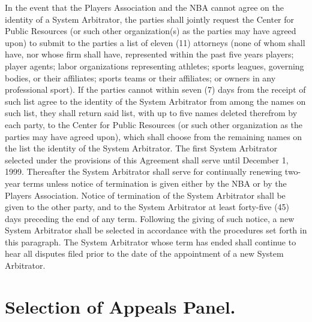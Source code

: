 \documentclass[
]{book}
\begin{document}
In the event that the Players Association and the NBA cannot agree on the identity of a System Arbitrator, the parties shall jointly request the Center for Public Resources (or such other organization(s) as the parties may have agreed upon) to submit to the parties a list of eleven (11) attorneys (none of whom shall have, nor whose firm shall have, represented within the past five years players; player agents; labor organizations representing athletes; sports leagues, governing bodies, or their affiliates; sports teams or their affiliates; or owners in any professional sport). If the parties cannot within seven (7) days from the receipt of such list agree to the identity of the System Arbitrator from among the names on such list, they shall return said list, with up to five names deleted therefrom by each party, to the Center for Public Resources (or such other organization as the parties may have agreed upon), which shall choose from the remaining names on the list the identity of the System Arbitrator. The first System Arbitrator selected under the provisions of this Agreement shall serve until December 1, 1999. Thereafter the System Arbitrator shall serve for continually renewing two-year terms unless notice of termination is given either by the NBA or by the Players Association. Notice of termination of the System Arbitrator shall be given to the other party, and to the System Arbitrator at least forty-five (45) days preceding the end of any term. Following the giving of such notice, a new System Arbitrator shall be selected in accordance with the procedures set forth in this paragraph. The System Arbitrator whose term has ended shall continue to hear all disputes filed prior to the date of the appointment of a new System Arbitrator.

\hypertarget{selection-of-appeals-panel.}{%
\section{Selection of Appeals Panel.}\label{selection-of-appeals-panel.}}
\end{document}

